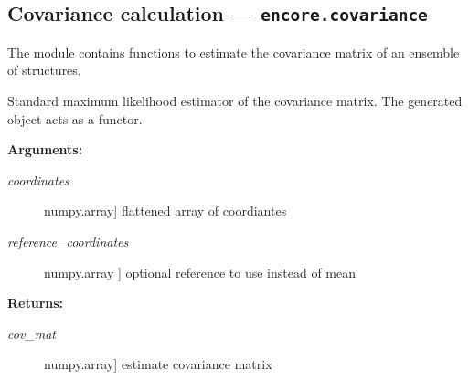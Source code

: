 \documentclass[letterpaper,10pt,english]{sphinxmanual}
\begin{document}
\subsection{Covariance calculation --- \texttt{encore.covariance}}
\label{index:covariance-calculation-encore-covariance}
The module contains functions to estimate the covariance matrix of
an ensemble of structures.

\begin{fulllineitems}
\label{index:encore.covariance.EstimatorML}
Standard maximum likelihood estimator of the covariance matrix. 
The generated object acts as a functor.

\begin{fulllineitems}
\label{index:encore.covariance.EstimatorML.calculate}
\textbf{Arguments:}
\begin{description}
\item[{\emph{coordinates}}] \leavevmode{[}numpy.array{]}
flattened array of coordiantes

\item[{\emph{reference\_coordinates}}] \leavevmode{[}numpy.array {]}
optional reference to use instead of mean

\end{description}

\textbf{Returns:}
\begin{description}
\item[{\emph{cov\_mat}}] \leavevmode{[}numpy.array{]}
estimate covariance matrix

\end{description}

\end{fulllineitems}


\end{fulllineitems}

\end{document}
